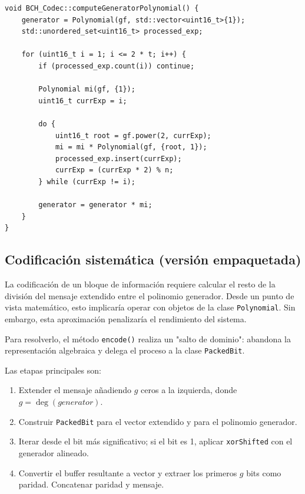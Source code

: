 \begin{lstlisting}[style=CodigoCPP, caption={Lógica de cálculo del polinomio generador del código BCH mediante la agrupación de raíces conjugadas y polinomios mínimos.}, label={lst:bch_generator_poly}]
void BCH_Codec::computeGeneratorPolynomial() {
    generator = Polynomial(gf, std::vector<uint16_t>{1});
    std::unordered_set<uint16_t> processed_exp;

    for (uint16_t i = 1; i <= 2 * t; i++) {
        if (processed_exp.count(i)) continue;

        Polynomial mi(gf, {1});
        uint16_t currExp = i;

        do {
            uint16_t root = gf.power(2, currExp);
            mi = mi * Polynomial(gf, {root, 1});
            processed_exp.insert(currExp);
            currExp = (currExp * 2) % n;
        } while (currExp != i);

        generator = generator * mi;
    }
}
\end{lstlisting}

\subsection{Codificación sistemática (versión empaquetada)}

La codificación de un bloque de información requiere calcular el resto de la división del mensaje extendido entre el polinomio generador. Desde un punto de vista matemático, esto implicaría operar con objetos de la clase \texttt{Polynomial}. Sin embargo, esta aproximación penalizaría el rendimiento del sistema.

Para resolverlo, el método \texttt{encode()} realiza un "salto de dominio": abandona la representación algebraica y delega el proceso a la clase \texttt{PackedBit}.

Las etapas principales son:

\begin{enumerate}
  \item Extender el mensaje añadiendo $g$ ceros a la izquierda, donde $g=\deg(generator)$.
  \item Construir \texttt{PackedBit} para el vector extendido y para el polinomio generador.
  \item Iterar desde el bit más significativo; si el bit es 1, aplicar \texttt{xorShifted} con el generador alineado.
  \item Convertir el buffer resultante a vector y extraer los primeros $g$ bits como paridad. Concatenar paridad y mensaje.
\end{enumerate}

